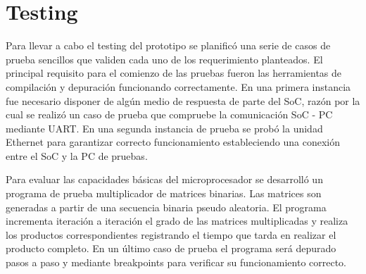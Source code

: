 \newpage
		\section{Testing}

Para llevar a cabo el testing del prototipo se planificó una serie de casos de prueba sencillos que validen cada uno de los requerimiento planteados.
El principal requisito para el comienzo de las pruebas fueron las herramientas de compilación y depuración funcionando correctamente. En una primera
instancia fue necesario disponer de algún medio de respuesta de parte del SoC, razón por la cual se realizó un caso de prueba que compruebe la
comunicación SoC - PC mediante UART.  En una segunda instancia de prueba se probó la unidad Ethernet para garantizar correcto funcionamiento
estableciendo una conexión entre el SoC y la PC de pruebas. 

Para evaluar las capacidades básicas del microprocesador se desarrolló un programa de prueba multiplicador de matrices binarias. Las matrices son
generadas a partir de una secuencia binaria pseudo aleatoria. El programa incrementa iteración a iteración el grado de las matrices multiplicadas y
realiza los productos correspondientes registrando el tiempo que tarda en realizar el producto completo. En un último caso de prueba el programa será
depurado pasos a paso y mediante breakpoints para verificar su funcionamiento correcto.

